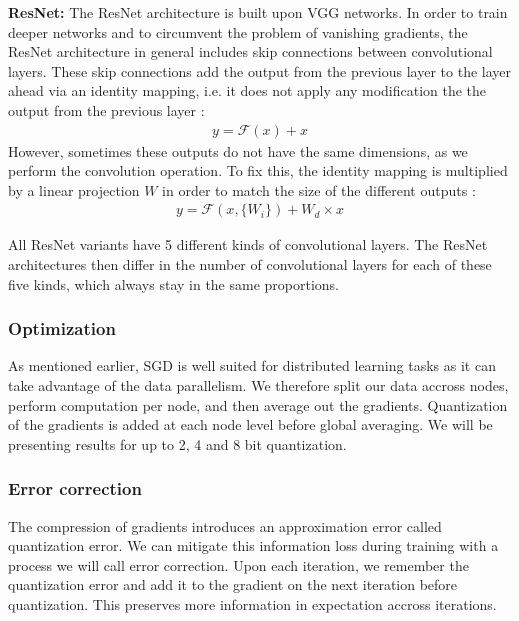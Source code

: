 \documentclass[10pt,conference,compsocconf]{IEEEtran}
\begin{document}
\noindent \textbf{ResNet:}
The ResNet architecture is built upon VGG networks. In order to train deeper networks and to circumvent the problem of vanishing gradients, the ResNet architecture in general includes skip connections between convolutional layers. These skip connections add the output from the previous layer to the layer ahead via an identity mapping, i.e. it does not apply any modification the the output from the previous layer \cite{resnet}:
\begin{align*}
    y = \mathcal{F}(x) + x
\end{align*}
However, sometimes these outputs do not have the same dimensions, as we perform the convolution operation. To fix this, the identity mapping is multiplied by a linear projection $W$ in order to match the size of the different outputs \cite{shorten}:
\begin{align*}
    y = \mathcal{F}(x, \{W_i\}) + W_d \times x
\end{align*}

All ResNet variants have 5 different kinds of convolutional layers. The ResNet architectures then differ in the number of convolutional layers for each of these five kinds, which always stay in the same proportions.


\subsubsection{Optimization}

As mentioned earlier, SGD is well suited for distributed learning tasks as it can take advantage of the data parallelism. We therefore split our data accross nodes, perform computation per node, and then average out the gradients. Quantization of the gradients is added at each node level before global averaging. We will be presenting results for up to 2, 4 and 8 bit quantization.

\subsubsection{Error correction}

The compression of gradients introduces an approximation error called quantization error. We can mitigate this information loss during training with a process we will call error correction. Upon each iteration, we remember the quantization error and add it to the gradient on the next iteration before quantization. This preserves more information in expectation accross iterations.
\end{document}
